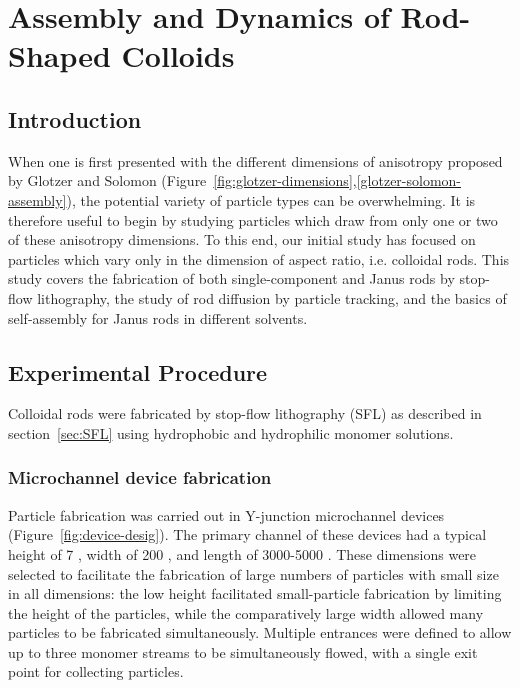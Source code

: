\chapter{Assembly and Dynamics of Rod-Shaped Colloids}
\section{Introduction}

When one is first presented with the different dimensions of anisotropy proposed by 
Glotzer and Solomon (Figure~\ref{fig:glotzer-dimensions},\ref{glotzer-solomon-assembly}), the
potential variety of particle types can be overwhelming. It is therefore useful to begin by studying 
particles which draw from only one or two of these anisotropy dimensions. To this end, our
initial study has focused on particles which vary only in the dimension of 
aspect ratio, i.e. colloidal rods. This study covers the fabrication of both single-component and 
Janus rods by stop-flow lithography, the study of rod diffusion by particle tracking, and the basics
of self-assembly for Janus rods in different solvents.


\section{Experimental Procedure}

Colloidal rods were fabricated by stop-flow lithography (SFL) as described in section~\ref{sec:SFL} using
hydrophobic and hydrophilic monomer solutions.  

\subsection{Microchannel device fabrication}

Particle fabrication was carried out in Y-junction microchannel devices (Figure~\ref{fig:device-desig}).
The primary channel of these devices had a typical 
height of 7 \microns, width of 200 \microns, and length of 3000-5000 \microns. These dimensions were selected
to facilitate the fabrication of large numbers of particles with small size in all dimensions: the low height
facilitated small-particle fabrication by limiting the height of the particles, while the comparatively large
width allowed many particles to be fabricated simultaneously. Multiple entrances were defined to allow up to three
monomer streams to be simultaneously flowed, with a single exit point for collecting particles.

